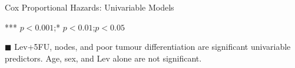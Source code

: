 \documentclass[aspectratio=169, 10pt]{beamer}
\begin{document}
\begin{frame}{Cox Proportional Hazards: Univariable Models}
\begin{center}
\begin{table}[ht]
\begin{center}
				
	\end{center}
	\vspace{5pt}  %
	\begin{flushleft}
		\centering
		\scriptsize
		\vspace{-0.2cm} 
		*** $p<0.001$;\quad ** $p<0.01$;\quad * $p<0.05$  %
	\end{flushleft}
\end{table}
\end{center}
\vspace{-0.25cm}
\small
$\blacksquare$ Lev+5FU, nodes, and poor tumour differentiation are
significant univariable predictors. Age, sex, and Lev alone
are not significant.

\end{frame}
\end{document}
